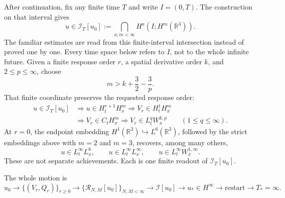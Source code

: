 After continuation, fix any finite time \(T\) and write \(I=(0,T)\).  The
construction on that interval gives
\[
u\in\mathcal I_T[u_0]
:=\bigcap_{a,m<\infty}H^a(I;H^m(\mathbb R^3)).
\]
The familiar estimates are read from this finite-interval intersection instead
of proved one by one.  Every time space below refers to \(I\), not to the whole
infinite future.  Given a finite response order \(r\), a spatial
derivative order \(k\), and \(2\le p\le\infty\), choose
\[
m>k+\frac32-\frac3p.
\]
That finite coordinate preserves the requested response order:
\[
\begin{aligned}
u\in\mathcal I_T[u_0]
&\Longrightarrow u\in H_t^{r+1}H_x^m
\Longrightarrow V_r\in H_t^1H_x^m\\
&\Longrightarrow V_r\in C_tH_x^m
\Longrightarrow V_r\in L_t^qW_x^{k,p}
\qquad(1\le q\le\infty).
\end{aligned}
\]
At \(r=0\), the endpoint embedding
\(H^1(\mathbb R^3)\hookrightarrow L^6(\mathbb R^3)\), followed by the strict
embeddings above with \(m=2\) and \(m=3\), recovers, among many others,
\[
u\in L_t^\infty L_x^6,
\qquad
u\in L_t^\infty L_x^\infty,
\qquad
u\in L_t^\infty W_x^{1,\infty}.
\]
These are not separate achievements.  Each is one finite readout of
\(\mathcal I_T[u_0]\).

The whole motion is
\[
\boxed{
u_0
\longrightarrow \{(V_r,Q_r)\}_{r\ge0}
\longrightarrow \{\mathcal R_{N,M}[u_0]\}_{N,M<\infty}
\longrightarrow \mathcal I[u_0]
\longrightarrow u_*\in H^\infty
\longrightarrow \text{restart}
\longrightarrow T_*=\infty.
}
\]

\endgroup

